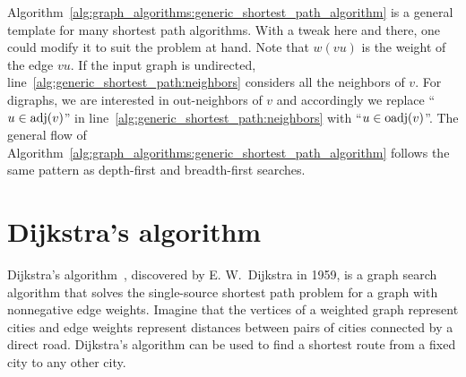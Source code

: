 Algorithm~\ref{alg:graph_algorithms:generic_shortest_path_algorithm}
is a general template for many shortest path algorithms. With a tweak
here and there, one could modify it to suit the problem at hand. Note
that $w(vu)$ is the weight of the edge $vu$. If the input graph is
undirected, line~\ref{alg:generic_shortest_path:neighbors} considers
all the neighbors of $v$. For digraphs, we are interested in
out-neighbors of $v$ and accordingly we replace ``$u \in \operatorname*{adj}(v)$'' in
line~\ref{alg:generic_shortest_path:neighbors} with
``$u \in \operatorname*{oadj}(v)$''. The general flow of
Algorithm~\ref{alg:graph_algorithms:generic_shortest_path_algorithm}
follows the same pattern as depth-first and breadth-first searches.



\section{Dijkstra's algorithm}
\label{sec:graph_algorithms:Dijkstra_algorithm}

Dijkstra's algorithm~\cite{Dijkstra1959}, discovered by E. W.~Dijkstra
in 1959, is a graph search algorithm that solves the single-source
shortest path problem for a graph with nonnegative edge
weights. Imagine that the vertices of a weighted graph represent
cities and edge weights represent distances between pairs of cities
connected by a direct road. Dijkstra's algorithm can be used to find a
shortest route from a fixed city to any other city.

